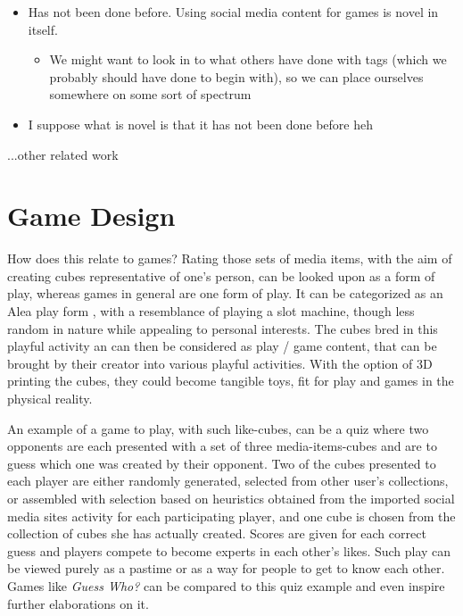 \documentclass[]{article}
\begin{document}
\begin{itemize}
\item Has not been done before. Using social media content for games is novel in itself.
	\begin{itemize}
	\item We might want to look in to what others have done with tags (which we probably should have done to begin with), so we can place ourselves somewhere on some sort of spectrum
	\end{itemize}
\item I suppose what is novel is that it has not been done before heh
\end{itemize}

...other related work




\section{Game Design}
\label{sec:GameDesign}

How does this relate to games?  Rating those sets of media items, with the aim of creating cubes representative of one's person, can be looked upon as a form of play, whereas games in general are one form of play.  It can be categorized as an Alea play form \cite{caillois2001man}, with a resemblance of playing a slot machine, though less random in nature while appealing to personal interests.  The cubes bred in this playful activity an can then be considered as play / game content, that can be brought by their creator into various playful activities.  With the option of 3D printing the cubes, they could become tangible toys, fit for play and games in the physical reality.

An example of a game to play, with such like-cubes, can be a quiz where two opponents are each presented with a set of three media-items-cubes and are to guess which one was created by their opponent.  Two of the cubes presented to each player are either randomly generated, selected from other user's collections, or assembled with selection based on heuristics obtained from the imported social media sites activity for each participating player, and one cube is chosen from the collection of cubes she has actually created.  Scores are given for each correct guess and players compete to become experts in each other's likes.  Such play can be viewed purely as a pastime or as a way for people to get to know each other.  Games like \textit{Guess Who?}\cite{GuessWho} can be compared to this quiz example and even inspire further elaborations on it.
\end{document}
